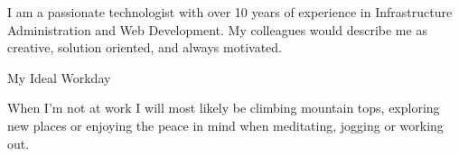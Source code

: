 




I am a passionate technologist with over 10 years of experience in
Infrastructure Administration and Web Development.
My colleagues would
describe me as
{\color{accent}creative},
{\color{accent}solution oriented},
and always {\color{accent}motivated}.


\vspace{1.9mm}

\begin{center}
{\small\color{body}My Ideal Workday}
\end{center}

\vspace{4.1mm}

When I'm not at work I will most likely be climbing mountain tops, exploring new places or
enjoying the peace in mind when meditating, jogging or working out.



\begin{spacing}{1.8}
%
\end{spacing}


